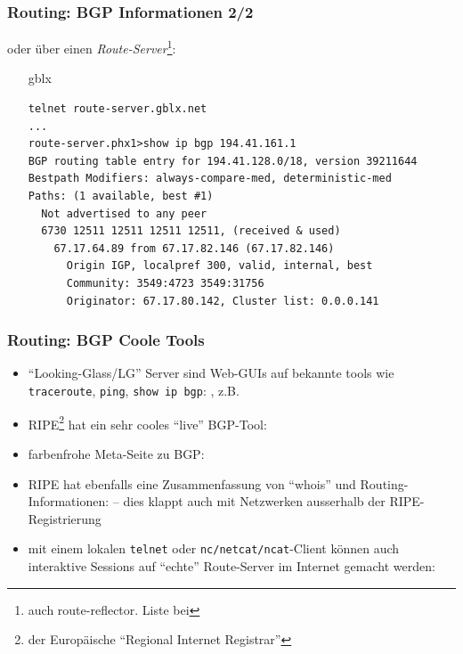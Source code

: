 \documentclass[ignorenonframetext]{beamer}
\begin{document}
\begin{frame}[fragile]
\frametitle{Routing: BGP Informationen 2/2}
oder \"uber einen {\em Route-Server}{}\footnote{auch route-reflector. Liste bei }:
\begin{itemize}
	\item[gblx]{
	  \begin{tiny}
	  \begin{verbatim}
telnet route-server.gblx.net
...
route-server.phx1>show ip bgp 194.41.161.1
BGP routing table entry for 194.41.128.0/18, version 39211644
Bestpath Modifiers: always-compare-med, deterministic-med
Paths: (1 available, best #1)
  Not advertised to any peer
  6730 12511 12511 12511 12511, (received & used)
    67.17.64.89 from 67.17.82.146 (67.17.82.146)
      Origin IGP, localpref 300, valid, internal, best
      Community: 3549:4723 3549:31756
      Originator: 67.17.80.142, Cluster list: 0.0.0.141
	  \end{verbatim}
	  \end{tiny}
	}
\end{itemize}
\end{frame}




\begin{frame}[fragile]
\frametitle{Routing: BGP Coole Tools}

\begin{itemize}
  \item ``Looking-Glass/LG'' Server sind Web-GUIs auf bekannte tools wie \texttt{traceroute}, \texttt{ping}, \texttt{show ip bgp}: , z.B. 
  \item RIPE\footnote{der Europ\"aische ``Regional Internet Registrar''} hat ein sehr cooles ``live'' BGP-Tool: 
  \item farbenfrohe Meta-Seite zu BGP: 
  \item RIPE hat ebenfalls eine Zusammenfassung von ``whois'' und Routing-Informationen:  -- dies klappt auch mit Netzwerken ausserhalb der RIPE-Registrierung

  \item mit einem lokalen \texttt{telnet} oder \texttt{nc/netcat/ncat}-Client k\"onnen auch interaktive Sessions auf ``echte'' Route-Server im Internet gemacht werden:
\begin{tiny}\end{tiny}

\end{itemize}
	
\end{frame}
\end{document}
